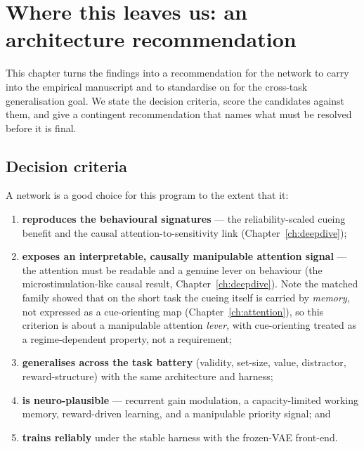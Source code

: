 \chapter{Where this leaves us: an architecture recommendation}
\label{ch:recommendation}

This chapter turns the findings into a recommendation for the network to carry into the
empirical manuscript and to standardise on for the cross-task generalisation goal. We state
the decision criteria, score the candidates against them, and give a contingent
recommendation that names what must be resolved before it is final.

\section{Decision criteria}
A network is a good choice for this program to the extent that it:
\begin{enumerate}
\item \textbf{reproduces the behavioural signatures} --- the reliability-scaled cueing
benefit and the causal attention-to-sensitivity link (Chapter~\ref{ch:deepdive});
\item \textbf{exposes an interpretable, causally manipulable attention signal} --- the
attention must be readable and a genuine lever on behaviour (the microstimulation-like
causal result, Chapter~\ref{ch:deepdive}). Note the matched family showed that on the
short task the cueing itself is carried by \emph{memory}, not expressed as a cue-orienting
map (Chapter~\ref{ch:attention}), so this criterion is about a manipulable attention
\emph{lever}, with cue-orienting treated as a regime-dependent property, not a requirement;
\item \textbf{generalises across the task battery} (validity, set-size, value, distractor,
reward-structure) with the same architecture and harness;
\item \textbf{is neuro-plausible} --- recurrent gain modulation, a capacity-limited working
memory, reward-driven learning, and a manipulable priority signal; and
\item \textbf{trains reliably} under the stable harness with the frozen-VAE front-end.
\end{enumerate}

